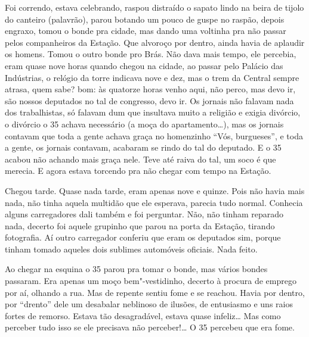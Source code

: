Foi correndo, estava celebrando, raspou distraído o sapato lindo na
beira de tijolo do canteiro (palavrão), parou botando um pouco de guspe
no raspão, depois engraxo, tomou o bonde pra cidade, mas dando uma
voltinha pra não passar pelos companheiros da Estação. Que alvoroço por
dentro, ainda havia de aplaudir os homens. Tomou o outro bonde pro Brás.
Não dava mais tempo, ele percebia, eram quase nove horas quando chegou
na cidade, ao passar pelo Palácio das Indústrias, o relógio da torre
indicava nove e dez, mas o trem da Central sempre atrasa, quem sabe?
bom: às quatorze horas venho aqui, não perco, mas devo ir, são nossos
deputados no tal de congresso, devo ir. Os jornais não falavam nada dos
trabalhistas, só falavam dum que insultava muito a religião e exigia
divórcio, o divórcio o 35 achava necessário (a moça do apartamento\ldots{}),
mas os jornais contavam que toda a gente achava graça no homenzinho
``Vós, burgueses'', e toda a gente, os jornais contavam, acabaram se
rindo do tal do deputado. E o 35 acabou não achando mais graça nele.
Teve até raiva do tal, um soco é que merecia. E agora estava torcendo
pra não chegar com tempo na Estação.

Chegou tarde. Quase nada tarde, eram apenas nove e quinze. Pois não
havia mais nada, não tinha aquela multidão que ele esperava, parecia
tudo normal. Conhecia alguns carregadores dali também e foi perguntar.
Não, não tinham reparado nada, decerto foi aquele grupinho que parou na
porta da Estação, tirando fotografia. Aí outro carregador conferiu que
eram os deputados sim, porque tinham tomado aqueles dois sublimes
automóveis oficiais. Nada feito.

Ao chegar na esquina o 35 parou pra tomar o bonde, mas vários bondes
passaram. Era apenas um moço bem"-vestidinho, decerto à procura de
emprego por aí, olhando a rua. Mas de repente sentiu fome e se reachou.
Havia por dentro, por ``drento'' dele um desabalar neblinoso de ilusões,
de entusiasmo e uns raios fortes de remorso. Estava tão desagradável,
estava quase infeliz\ldots{} Mas como perceber tudo isso se ele precisava não
perceber!\ldots{} O 35 percebeu que era fome.

